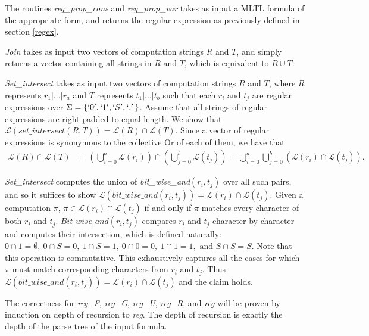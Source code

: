 \documentclass[runningheads]{llncs}
\begin{document}
The routines \textit{reg\_prop\_cons} and \textit{reg\_prop\_var} takes as input a MLTL formula of the appropriate form, and returns the regular expression as previously defined in section \ref{regex}.

\textit{Join} takes as input two vectors of computation strings $R$ and $T$, and simply returns a vector containing all strings in $R$ and $T$, which is equivalent to $R \cup T$. 

\textit{Set\_intersect} takes as input two vectors of computation strings $R$ and $T$, where $R$ represents $r_1 | ... | r_a$ and $T$ represents $t_1 | ... | t_b$ such that each $r_i$ and $t_j$ are regular expressions over $\Sigma = \{`0', `1', `S', `,'\}$. Assume that all strings of regular expressions are right padded to equal length. We show that $\mathscr{L}(\textit{set\_intersect}(R, T)) = \mathscr{L}(R) \cap \mathscr{L}(T)$. Since a vector of regular expressions is synonymous to the collective Or of each of them, we have that 
\begin{align*}
    \mathscr{L}(R) \cap \mathscr{L}(T) &= \left(\bigcup_{i = 0}^a \mathscr{L}(r_i) \right)\cap \left( \bigcup_{j = 0}^b \mathscr{L}(t_j)\right) = \bigcup_{i = 0}^a \bigcup_{j = 0}^b \left(\mathscr{L}(r_i) \cap \mathscr{L}(t_j)\right).
\end{align*}

\textit{Set\_intersect} computes the union of \textit{bit\_wise\_and}$(r_i, t_j)$ over all such pairs, and so it suffices to show $\mathscr{L}(\textit{bit\_wise\_and}(r_i, t_j)) = \mathscr{L}(r_i) \cap \mathscr{L}(t_j)$.  Given a computation $\pi$, $\pi \in \mathscr{L}(r_i) \cap \mathscr{L}(t_j)$ if and only if $\pi$ matches every character of both $r_i$ and $t_j$. $\textit{Bit\_wise\_and}(r_i, t_j)$ compares $r_i$ and $t_j$ character by character and computes their intersection, which is defined naturally: $0 \cap 1 = \emptyset,\ 0 \cap S = 0,\ 1 \cap S = 1, \ 0 \cap 0 = 0, \ 1 \cap 1= 1,\text{ and } S \cap S = S$. Note that this operation is commutative. This exhaustively captures all the cases for which $\pi$ must match corresponding characters from $r_i$ and $t_j$. Thus $\mathscr{L}(\textit{bit\_wise\_and}(r_i, t_j)) = \mathscr{L}(r_i) \cap \mathscr{L}(t_j)$ and the claim holds.

The correctness for \textit{reg\_F}, \textit{reg\_G}, \textit{reg\_U}, \textit{reg\_R}, and \textit{reg} will be proven by induction on depth of recursion to \textit{reg}. 
The depth of recursion is exactly the depth of the parse tree of the input formula.
\end{document}
